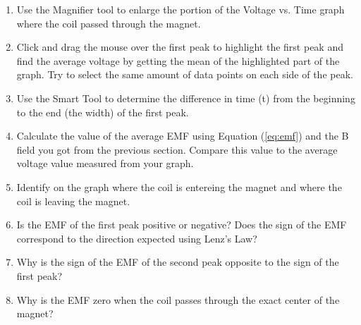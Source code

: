 \begin{enumerate}
 \item Use the Magnifier tool to enlarge the portion of the Voltage vs. Time graph where the coil passed through the magnet.

 \item Click and drag the mouse over the first peak to highlight the first peak and find the average voltage by getting the mean of the highlighted part of the graph. Try to select the same amount of data points on each side of the peak.

 \item Use the Smart Tool to determine the difference in time (t) from the beginning to the end (the width) of the first peak.

 \item Calculate the value of the average EMF using Equation (\ref{eq:emf}) and the B field you got from the previous section. Compare this value to the average voltage value measured from your graph.

 \item Identify on the graph where the coil is entereing the magnet and where the coil is leaving the magnet.

 \item Is the EMF of the first peak positive or negative? Does the sign of the EMF correspond to the direction expected using Lenz's Law?

 \item Why is the sign of the EMF of the second peak opposite to the sign of the first peak?

 \item Why is the EMF zero when the coil passes through the exact center of the magnet?

\end{enumerate}
